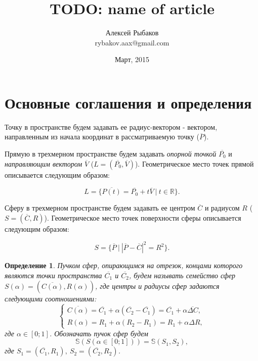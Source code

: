\documentclass[a4paper,10pt]{extarticle}                     %
\numberwithin{equation}{section}                             %
\numberwithin{figure}{section}                               %
\theoremstyle{plain}                                         %
\newtheorem{definition}{Определение}[section]                %
\begin{document}
\title{TODO: name of article}
\author{Алексей Рыбаков \\ rybakov.aax@gmail.com}
\date{Март, 2015}
\maketitle

\section{Основные соглашения и определения}

Точку в пространстве будем задавать ее радиус-вектором - вектором, направленным из начала координат в рассматриваемую точку ($\overline{P}$).

Прямую в трехмерном пространстве будем задавать \textit{опорной точкой} $\overline{P_0}$ и \textit{направляющим вектором} $\overline{V}$ ($L = (\overline{P_0}, \overline{V})$).
Геометрическое место точек прямой описывается следующим образом:

\begin{equation}
    L = \{ \overline{P(t)} = \overline{P_0} + t\overline{V} \ | \ t \in \mathbb{R} \}.
\end{equation}

Сферу в трехмерном пространстве будем задавать ее центром $\overline{C}$ и радиусом $R$ ($S = (\overline{C}, R)$).
Геометрическое место точек поверхности сферы описывается следующим образом:

\begin{equation}
    S = \{ \overline{P} \ | \ {|\overline{P} - \overline{C}|}^2 = R^2 \}.
\end{equation}

\begin{definition}
Пучком сфер, опирающимся на отрезок, концами которого являются точки пространства $\overline{C_1}$ и $\overline{C_2}$, будем называть семейство сфер $S(\alpha) = (\overline{C(\alpha)}, R(\alpha))$, где центры и радиусы сфер задаются следующими соотношениями:
\begin{equation}
    \begin{cases}
        \overline{C(\alpha)} = \overline{C_1} + \alpha(\overline{C_2} - \overline{C_1}) = \overline{C_1} + \alpha \overline{\Delta C}, \\
        R(\alpha) = R_1 + \alpha(R_2 - R_1) = R_1 + \alpha \Delta R,
    \end{cases}
\end{equation}
где $\alpha \in [0; 1]$.
Обозначать пучок сфер будем
\begin{equation}
    \mathbb{S}(S(\alpha \in [0; 1])) = \mathbb{S}(S_1, S_2),
\end{equation}
где $S_1 = (\overline{C_1}, R_1), \ S_2 = (\overline{C_2}, R_2)$.
\end{definition}
\end{document}
